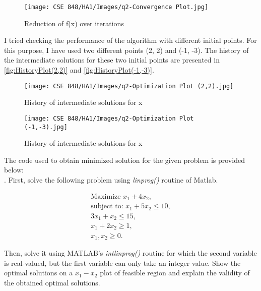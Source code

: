 \documentclass{article}
\begin{document}
\begin{figure}[H]
    \centering
    \texttt{[image: CSE 848/HA1/Images/q2-Convergence Plot.jpg]}
    \caption{Reduction of f(x) over iterations} 
    \label{fig:ConvergencePlot}
\end{figure}

I tried checking the performance of the algorithm with different initial points. For this purpose, I have used two different points (2, 2) and (-1, -3). The history of the intermediate solutions for these two initial points are presented in \autoref{fig:HistoryPlot(2,2)} and \autoref{fig:HistoryPlot(-1,-3)}.

\begin{figure}[H]
    \centering
    \texttt{[image: CSE 848/HA1/Images/q2-Optimization Plot (2,2).jpg]}
    \caption{History of intermediate solutions for x} 
    \label{fig:HistoryPlot(2,2)}
\end{figure}

\begin{figure}[H]
    \centering
    \texttt{[image: CSE 848/HA1/Images/q2-Optimization Plot (-1,-3).jpg]}
    \caption{History of intermediate solutions for x} 
    \label{fig:HistoryPlot(-1,-3)}
\end{figure}

The code used to obtain minimized solution for the given problem is provided below:\\





. First, solve the following problem using \textit{linprog()} routine of Matlab.

\begin{align*}
    \textrm{Maximize } x_1 + 4x_2,\\
    \textrm{subject to: } x_1 + 5x_2 \leq 10,\\
    3x_1 + x_2 \leq 15,\\  
    x_1 + 2x_2 \geq 1,\\
    x_1,x_2 \geq 0.
\end{align*}


Then, solve it using MATLAB’s \textit{intlinprog()} routine for which the second variable is real-valued, but the first variable can only take an integer value.
Show the optimal solutions on a $x_1-x_2$ plot of feasible region and explain the validity of the obtained optimal solutions.\\
\end{document}
